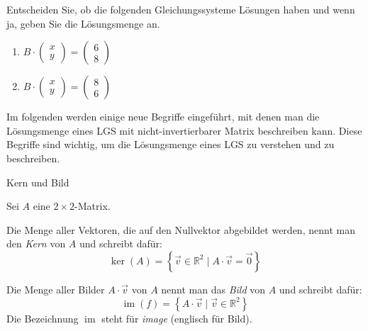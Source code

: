\begin{LA}
Entscheiden Sie, ob die folgenden Gleichungssysteme Lösungen haben und wenn ja, geben Sie die Lösungsmenge an.
\begin{enumerate}
    \item $B \cdot \begin{pmatrix}
    x\\y
\end{pmatrix}= \begin{pmatrix}
    6\\8
\end{pmatrix}$
    \item $B \cdot \begin{pmatrix}
    x\\y
\end{pmatrix}= \begin{pmatrix}
    8\\6
\end{pmatrix}$
\end{enumerate}
\end{LA}





















\clearpage
Im folgenden werden einige neue Begriffe eingeführt, mit denen man die Lösungsmenge eines LGS mit nicht-invertierbarer Matrix beschreiben kann. Diese Begriffe sind wichtig, um die Lösungsmenge eines LGS zu verstehen und zu beschreiben.

\begin{definition}
    {Kern und Bild}{}
   
Sei \( A\) eine $2\times2$-Matrix. 

Die Menge aller Vektoren, die auf den Nullvektor abgebildet werden, nennt man den \emph{Kern} von \( A \) und schreibt dafür:
\[
\ker(A) = \left\{ \vec{v} \in \mathbb{R}^2 \mid A\cdot \vec{v} = \vec{0} \right\}
\]

Die Menge aller Bilder $A\cdot \vec{v}$ von \( A \) nennt man das \emph{Bild} von \( A \) und schreibt dafür:
\[
\operatorname{im}(f) = \left\{ A\cdot \vec{v} \mid \vec{v} \in \mathbb{R}^2 \right\}
\]
Die Bezeichnung \( \operatorname{im} \) steht für \emph{image} (englisch für Bild).


\end{definition}


